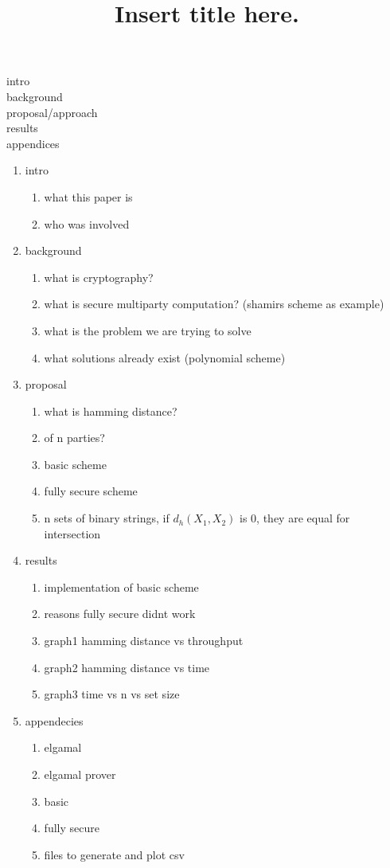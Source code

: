 \documentclass[12pt]{article}
\begin{document}
\title{Insert title here.}


intro
\\background
\\proposal/approach
\\results
\\appendices

\begin{enumerate}
\item intro
	\begin{enumerate}
	\item what this paper is
	\item who was involved
	\end{enumerate}
\item background
	\begin{enumerate}
	\item what is cryptography?
	\item what is secure multiparty computation? (shamirs scheme as example)
	\item what is the problem we are trying to solve
	\item what solutions already exist (polynomial scheme) 
	\end{enumerate}
\item proposal
	\begin{enumerate}
	\item what is hamming distance?
	\item of n parties?
	\item basic scheme
	\item fully secure scheme
	\item n sets of binary strings, if $d_h(X_1,X_2)$ is 0, they are equal for intersection
	\end{enumerate}
\item results
	\begin{enumerate}
	\item implementation of basic scheme
	\item reasons fully secure didnt work
	\item graph1 hamming distance vs throughput
	\item graph2 hamming distance vs time
	\item graph3 time vs n vs set size
	\end{enumerate}
\item appendecies
	\begin{enumerate}
	\item elgamal
	\item elgamal prover
	\item basic
	\item fully secure
	\item files to generate and plot csv
	\end{enumerate}
\end{enumerate}
\end{document}
